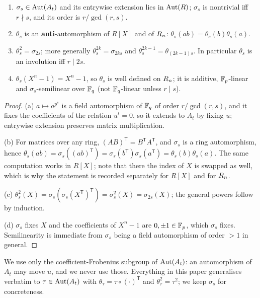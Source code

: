 \begin{lemma}\label{lem:theta}
\begin{enumerate}[label=\textnormal{(\alph*)},leftmargin=*]
\item $\sigma_s\in\operatorname{Aut}(A_t)$ and its entrywise extension lies in $\operatorname{Aut}(R)$;
  $\sigma_s$ is nontrivial iff $r\nmid s$, and its order is $r/\gcd(r,s)$.
\item $\theta_s$ is an \textbf{anti}-automorphism of $R[X]$ and of $R_n$:
  $\theta_s(ab)=\theta_s(b)\theta_s(a)$.
\item $\theta_s^2=\sigma_{2s}$; more generally $\theta_s^{2k}=\sigma_{2ks}$ and
  $\theta_s^{2k-1}=\theta_{(2k-1)s}$. In particular $\theta_s$ is an involution
  iff $r\mid 2s$.
\item $\theta_s(X^n-1)=X^n-1$, so $\theta_s$ is well defined on $R_n$; it is
  additive, $\mathbb F_p$-linear and $\sigma_s$-semilinear over $\mathbb F_q$ (not
  $\mathbb F_q$-linear unless $r\mid s$).
\end{enumerate}
\end{lemma}

\begin{proof}
(a) $a\mapsto a^{p^s}$ is a field automorphism of $\mathbb F_q$ of order
$r/\gcd(r,s)$, and it fixes the coefficients of the relation $u^t=0$, so it
extends to $A_t$ by fixing $u$; entrywise extension preserves matrix
multiplication.

(b) For matrices over any ring, $(AB)^{\mathsf T}=B^{\mathsf T}A^{\mathsf T}$,
and $\sigma_s$ is a ring automorphism, hence
$\theta_s(ab)=\sigma_s((ab)^{\mathsf T})
=\sigma_s(b^{\mathsf T})\sigma_s(a^{\mathsf T})=\theta_s(b)\theta_s(a)$. The
same computation works in $R[X]$; note that there the index of $X$ is swapped
as well, which is why the statement is recorded separately for $R[X]$ and for
$R_n$.

(c) $\theta_s^2(X)=\sigma_s(\sigma_s(X^{\mathsf T})^{\mathsf T})=\sigma_s^2(X)
=\sigma_{2s}(X)$; the general powers follow by induction.

(d) $\sigma_s$ fixes $X$ and the coefficients of $X^n-1$ are $0,\pm1\in\mathbb F_p$,
which $\sigma_s$ fixes. Semilinearity is immediate from $\sigma_s$ being a field
automorphism of order $>1$ in general.
\end{proof}

\begin{remark}
We use only the coefficient-Frobenius subgroup of $\operatorname{Aut}(A_t)$: an automorphism
of $A_t$ may move $u$, and we never use those. Everything in this paper
generalises verbatim to $\tau\in\operatorname{Aut}(A_t)$ with $\theta_\tau=\tau\circ(\cdot)^{\mathsf T}$
and $\theta_\tau^2=\tau^2$; we keep $\sigma_s$ for concreteness.
\end{remark}

